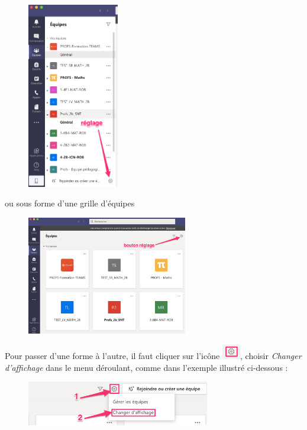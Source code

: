 \begin{figure}[h]
\includegraphics[width=4cm]{./images/teams/accueil_liste}
\centering
\end{figure}

\newpage
ou sous forme d'une grille d'équipes 

\begin{figure}[H]
\includegraphics[width=7cm]{./images/teams/accueil_grille}
\centering
\end{figure}

Pour passer d'une forme à l'autre, il faut cliquer sur l'icône \includegraphics[width=0.8cm]{./images/teams/bouton_parametres}, choisir \textit{Changer d'affichage} dans le menu déroulant, comme dans l'exemple illustré ci-dessous :

\begin{figure}[h]
\includegraphics[width=8cm]{./images/teams/changement_liste}
\centering
\end{figure}

